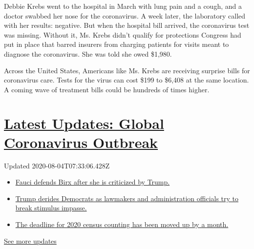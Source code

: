 Debbie Krebs went to the hospital in March with lung pain and a cough,
and a doctor swabbed her nose for the coronavirus. A week later, the
laboratory called with her results: negative. But when the hospital bill
arrived, the coronavirus test was missing. Without it, Ms. Krebs didn't
qualify for protections Congress had put in place that barred insurers
from charging patients for visits meant to diagnose the coronavirus. She
was told she owed \$1,980.

Across the United States, Americans like Ms. Krebs are receiving
surprise bills for coronavirus care. Tests for the virus can cost \$199
to \$6,408 at the same location. A coming wave of treatment bills could
be hundreds of times higher.

\hypertarget{latest-updates-global-coronavirus-outbreak}{%
\section{\texorpdfstring{\href{https://www.nytimes.com/2020/08/03/world/coronavirus-covid-19.html?action=click\&pgtype=Article\&state=default\&region=MAIN_CONTENT_1\&context=storylines_live_updates}{Latest
Updates: Global Coronavirus
Outbreak}}{Latest Updates: Global Coronavirus Outbreak}}\label{latest-updates-global-coronavirus-outbreak}}

Updated 2020-08-04T07:33:06.428Z

\begin{itemize}
\tightlist
\item
  \href{https://www.nytimes.com/2020/08/03/world/coronavirus-covid-19.html?action=click\&pgtype=Article\&state=default\&region=MAIN_CONTENT_1\&context=storylines_live_updates\#link-4547638f}{Fauci
  defends Birx after she is criticized by Trump.}
\item
  \href{https://www.nytimes.com/2020/08/03/world/coronavirus-covid-19.html?action=click\&pgtype=Article\&state=default\&region=MAIN_CONTENT_1\&context=storylines_live_updates\#link-15e7f995}{Trump
  derides Democrats as lawmakers and administration officials try to
  break stimulus impasse.}
\item
  \href{https://www.nytimes.com/2020/08/03/world/coronavirus-covid-19.html?action=click\&pgtype=Article\&state=default\&region=MAIN_CONTENT_1\&context=storylines_live_updates\#link-e5a2cda}{The
  deadline for 2020 census counting has been moved up by a month.}
\end{itemize}

\href{https://www.nytimes.com/2020/08/03/world/coronavirus-covid-19.html?action=click\&pgtype=Article\&state=default\&region=MAIN_CONTENT_1\&context=storylines_live_updates}{See
more updates}

